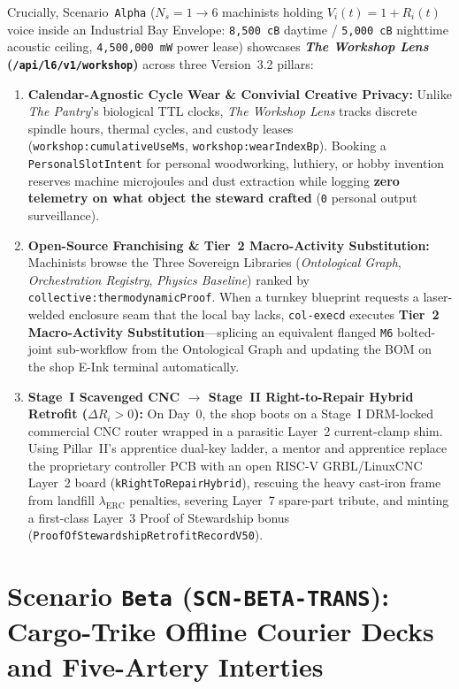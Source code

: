 Crucially, Scenario~\texttt{Alpha} ($N_s = 1 \to 6$ machinists holding $V_i(t) = 1 + R_i(t)$ voice inside an Industrial Bay Envelope: \texttt{8,500 cB} daytime / \texttt{5,000 cB} nighttime acoustic ceiling, \texttt{4,500,000 mW} power lease) showcases \textbf{\textit{The Workshop Lens} (\texttt{/api/l6/v1/workshop})} across three Version~3.2 pillars:
\begin{enumerate}
    \item \textbf{Calendar-Agnostic Cycle Wear \& Convivial Creative Privacy:} Unlike \textit{The Pantry}'s biological TTL clocks, \textit{The Workshop Lens} tracks discrete spindle hours, thermal cycles, and custody leases (\texttt{workshop:cumulativeUseMs}, \texttt{workshop:wearIndexBp}). Booking a \texttt{PersonalSlotIntent} for personal woodworking, luthiery, or hobby invention reserves machine microjoules and dust extraction while logging \textbf{zero telemetry on what object the steward crafted} (\texttt{0} personal output surveillance).
    \item \textbf{Open-Source Franchising \& Tier~2 Macro-Activity Substitution:} Machinists browse the Three Sovereign Libraries (\textit{Ontological Graph}, \textit{Orchestration Registry}, \textit{Physics Baseline}) ranked by \texttt{collective:thermodynamicProof}. When a turnkey blueprint requests a laser-welded enclosure seam that the local bay lacks, \texttt{col-execd} executes \textbf{Tier~2 Macro-Activity Substitution}---splicing an equivalent flanged \texttt{M6} bolted-joint sub-workflow from the Ontological Graph and updating the BOM on the shop E-Ink terminal automatically.
    \item \textbf{Stage~I Scavenged CNC $\to$ Stage~II Right-to-Repair Hybrid Retrofit ($\Delta R_i > 0$):} On Day~0, the shop boots on a Stage~I DRM-locked commercial CNC router wrapped in a parasitic Layer~2 current-clamp shim. Using Pillar~II's apprentice dual-key ladder, a mentor and apprentice replace the proprietary controller PCB with an open RISC-V GRBL/LinuxCNC Layer~2 board (\texttt{kRightToRepairHybrid}), rescuing the heavy cast-iron frame from landfill $\lambda_{\mathrm{ERC}}$ penalties, severing Layer~7 spare-part tribute, and minting a first-class Layer~3 Proof of Stewardship bonus (\texttt{ProofOfStewardshipRetrofitRecordV50}).
\end{enumerate}

\section{Scenario \texttt{Beta} (\texttt{SCN-BETA-TRANS}): Cargo-Trike Offline Courier Decks and Five-Artery Interties}
\label{sec:wave-b-beta}

